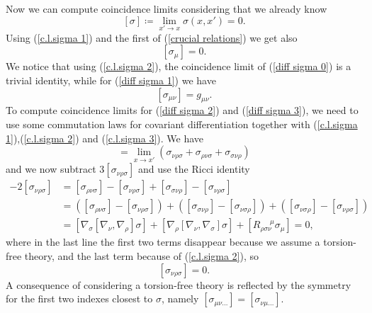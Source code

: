 Now we can compute coincidence limits considering that we already know
\begin{equation}\label{c.l.sigma 1}
    [\sigma] \coloneqq \lim_{x' \xrightarrow{} x} \sigma(x,x') = 0.
\end{equation}
Using (\ref{c.l.sigma 1}) and the first of (\ref{crucial relations}) we get also
\begin{equation}\label{c.l.sigma 2}
    [\sigma_\mu] = 0.
\end{equation}
We notice that using (\ref{c.l.sigma 2}), the coincidence limit of (\ref{diff sigma 0}) is a trivial identity, while for (\ref{diff sigma 1}) we have
\begin{equation}\label{c.l.sigma 3}
    [\sigma_{\mu\nu}] = g_{\mu\nu}.
\end{equation}
To compute coincidence limits for (\ref{diff sigma 2}) and (\ref{diff sigma 3}), we need to use some commutation laws for covariant differentiation together with (\ref{c.l.sigma 1}),(\ref{c.l.sigma 2}) and (\ref{c.l.sigma 3}). We have
\begin{equation}
    [\sigma_{\nu\rho\sigma}]= \lim_{x \xrightarrow{} x'} (\sigma_{\nu\rho\sigma} + \sigma_{\rho\nu\sigma} + \sigma_{\sigma\nu\rho})
\end{equation}
and we now subtract $3[\sigma_{\nu\rho\sigma}]$ and use the Ricci identity
\begin{equation}
    \begin{split}
        -2[\sigma_{\nu\rho\sigma}] &= [\sigma_{\rho\nu\sigma}] - [\sigma_{\nu\rho\sigma}] + [\sigma_{\sigma\nu\rho}] - [\sigma_{\nu\rho\sigma}]\\
        &= ([\sigma_{\rho\nu\sigma}] - [\sigma_{\nu\rho\sigma}]) + ([\sigma_{\sigma\nu\rho}] -[\sigma_{\nu\sigma\rho}]) + ([\sigma_{\nu\sigma\rho}] - [\sigma_{\nu\rho\sigma}])\\
        &= [\nabla_{\sigma}[\nabla_\nu,\nabla_\rho]\sigma] + [\nabla_\rho[\nabla_\nu,\nabla_\sigma]\sigma] + [R_{\rho\sigma\nu}^{\;\;\;\;\;\mu} \sigma_\mu] = 0,
    \end{split}
\end{equation}
where in the last line the first two terms disappear because we assume a torsion-free theory, and the last term because of (\ref{c.l.sigma 2}), so 
\begin{equation}\label{c.l.sigma 4}
    [\sigma_{\nu\rho\sigma}] = 0.
\end{equation}
A consequence of considering a torsion-free theory is reflected by the symmetry for the first two indexes closest to $\sigma$, namely $[\sigma_{\mu\nu\dots} ] = [\sigma_{\nu\mu\dots}]$.

